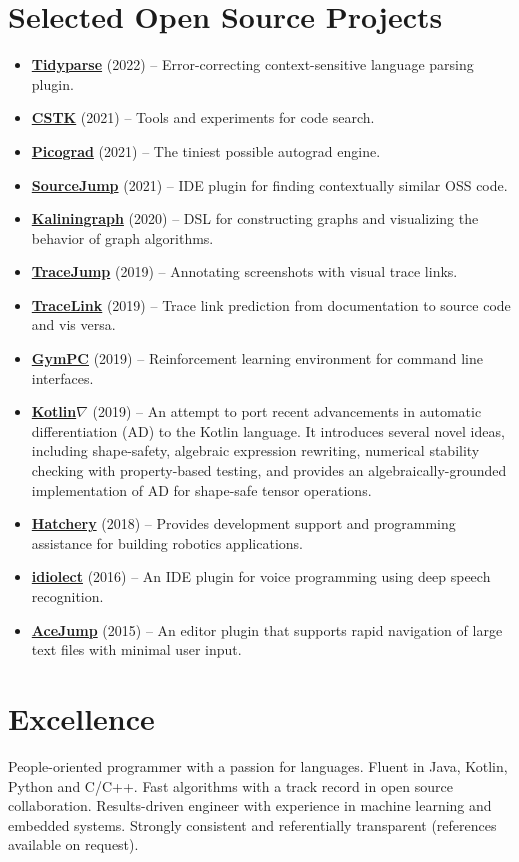 \documentclass[letterpaper,11pt]{article}
\newcommand{\resumeItem}[2]{
  \item\small{\textbf{#1}{ #2 }}
}
\newcommand{\resumeSubItem}[2]{\resumeItem{#1}{#2}}
\newcommand{\resumeSubHeadingListStart}{\begin{itemize}[leftmargin=*]}
\newcommand{\resumeSubHeadingListEnd}{\end{itemize}}
\begin{document}
\begin{justify}
\section{Selected Open Source Projects}
\resumeSubHeadingListStart
\resumeSubItem{\href{https://github.com/breandan/tidyparse}{Tidyparse}}{(2022) -- Error-correcting context-sensitive language parsing plugin.}
\resumeSubItem{\href{https://github.com/breandan/CSTK}{CSTK}}{(2021) -- Tools and experiments for code search.}
\resumeSubItem{\href{https://github.com/breandan/picograd}{Picograd}}{(2021) -- The tiniest possible autograd engine.}
\resumeSubItem{\href{https://github.com/acejump/sourcejump}{SourceJump}}{(2021) -- IDE plugin for finding contextually similar OSS code.}
\resumeSubItem{\href{https://github.com/breandan/kaliningraph}{Kaliningraph}}{(2020) -- DSL for constructing graphs and visualizing the behavior of graph algorithms.}
\resumeSubItem{\href{https://github.com/acejump/tracejump}{TraceJump}}{(2019) -- Annotating screenshots with visual trace links.}
\resumeSubItem{\href{https://github.com/breandan/tracelink}{TraceLink}}{(2019) -- Trace link prediction from documentation to source code and vis versa.}
\resumeSubItem{\href{https://github.com/breandan/gym-pc}{GymPC}}{(2019) -- Reinforcement learning environment for command line interfaces.}
\resumeSubItem{\href{https://github.com/breandan/kotlingrad}{Kotlin$\nabla$}}{(2019) -- An attempt to port recent advancements in automatic differentiation (AD) to the Kotlin language. It introduces several novel ideas, including shape-safety, algebraic expression rewriting, numerical stability checking with property-based testing, and provides an algebraically-grounded implementation of AD for shape-safe tensor operations.}
\resumeSubItem{\href{https://github.com/duckietown/hatchery}{Hatchery}}{(2018) -- Provides development support and programming assistance for building robotics applications.}
\resumeSubItem{\href{https://github.com/OpenASR/idiolect}{idiolect}}{(2016) -- An IDE plugin for voice programming using deep speech recognition.}
\resumeSubItem{\href{https://github.com/acejump/AceJump}{AceJump}}{(2015) -- An editor plugin that supports rapid navigation of large text files with minimal user input.}
\resumeSubHeadingListEnd

\section{Excellence}
People-oriented programmer with a passion for languages. Fluent in Java, Kotlin, Python and C/C++. Fast algorithms with a track record in open source collaboration. Results-driven engineer with experience in machine learning and embedded systems. Strongly consistent and referentially transparent (references available on request).
\end{justify}
\end{document}
